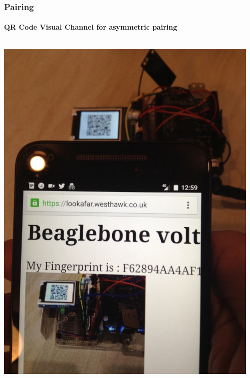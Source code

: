 \documentclass[handout, notes=hide]{beamer}
\begin{document}
\begin{frame}
\frametitle{Pairing}
\framesubtitle{QR Code Visual Channel for asymmetric pairing}

\begin{columns}[T]
\begin{column}[T]{0.33333\textwidth}
\includegraphics[width=1.0\textwidth]{iot-screen}
\end{column}
\begin{column}[T]{0.33333\textwidth}

\end{column}
\end{columns}
\end{frame}
\end{document}
